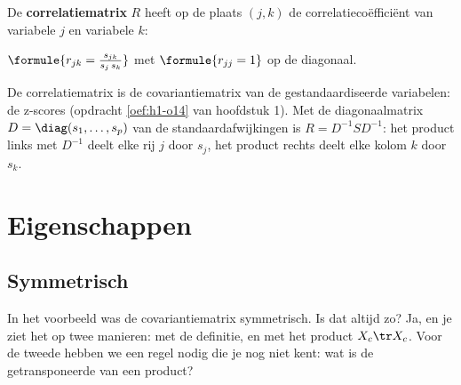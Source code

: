 \begin{theorie}
De \textbf{\textcolor{accent}{correlatiematrix}} $R$ heeft op de plaats $(j, k)$ de correlatiecoëfficiënt van variabele $j$ en variabele $k$:

\vspace{1mm}
\qquad $\formule{r_{jk} = \frac{s_{jk}}{s_j\,s_k}}$ \qquad met $\formule{r_{jj} = 1}$ op de diagonaal.
\end{theorie}

De correlatiematrix is de covariantiematrix van de gestandaardiseerde variabelen: de z-scores (opdracht \ref{oef:h1-o14} van hoofdstuk 1). Met de diagonaalmatrix $D = \diag(s_1, \ldots, s_p)$ van de standaardafwijkingen is $R = D^{-1} S D^{-1}$: het product links met $D^{-1}$ deelt elke rij $j$ door $s_j$, het product rechts deelt elke kolom $k$ door $s_k$.


\begin{oefeningen}
\end{oefeningen}

\section{Eigenschappen}

\subsection{Symmetrisch}

In het voorbeeld was de covariantiematrix symmetrisch. Is dat altijd zo? Ja, en je ziet het op twee manieren: met de definitie, en met het product $X_c\tr X_c$. Voor de tweede hebben we een regel nodig die je nog niet kent: wat is de getransponeerde van een product?

